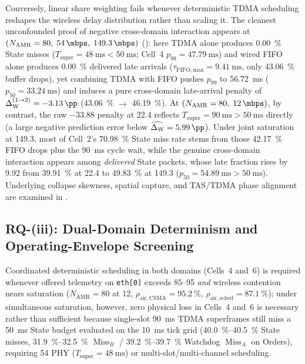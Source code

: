\documentclass[11pt,a4paper]{article}
\newcommand{\Namr}{\ensuremath{N_{\mathrm{AMR}}}}
\newcommand{\Tsuper}{\ensuremath{T_{\mathrm{super}}}}
\newcommand{\MissA}{\ensuremath{\operatorname{Miss}_A}}
\newcommand{\MissB}{\ensuremath{\operatorname{Miss}_B}}
\newcommand{\GainW}{\ensuremath{\Delta_{\mathrm{W}}}}
\newcommand{\GainWpair}{\ensuremath{\Delta_{\mathrm{W}}^{(1\to 2)}}}
\begin{document}
Conversely, linear share weighting fails whenever deterministic TDMA scheduling reshapes the wireless delay distribution rather than scaling it. The cleanest unconfounded proof of negative cross-domain interaction appears at $(\Namr=80,\; \qty{54}{\mbps},\; \qty{149.3}{\mbps})$ (): here TDMA alone produces \qty{0.00}{\percent} State misses ($\Tsuper = \qty{48}{\milli\second} < \qty{50}{\milli\second}$; Cell~4 $p_{99}=\qty{47.79}{\milli\second}$) and wired FIFO alone produces \qty{0.00}{\percent} delivered late arrivals ($\tau_{\mathrm{FIFO,max}} = \qty{9.41}{\milli\second}$, only \qty{43.06}{\percent} buffer drops), yet combining TDMA with FIFO pushes $p_{99}$ to \qty{56.72}{\milli\second} ($p_{50} = \qty{33.24}{\milli\second}$) and induces a pure cross-domain late-arrival penalty of $\GainWpair = \qty{-3.13}{\pp}$ (\qty{43.06}{\percent} $\to$ \qty{46.19}{\percent}). At $(\Namr=80,\; \qty{12}{\mbps})$, by contrast, the raw \qty{-33.88}{\pp} penalty at \qty{22.4}{\mbps} reflects $\Tsuper = \qty{90}{\milli\second} > \qty{50}{\milli\second}$ directly (a large negative prediction error below $\widehat{\GainW} = \qty{+5.99}{\pp}$). Under joint saturation at \qty{149.3}{\mbps}, most of Cell~2's \qty{70.98}{\percent} State miss rate stems from those \qty{42.17}{\percent} FIFO drops plus the \qty{90}{\milli\second} cycle wait, while the genuine cross-domain interaction appears among \emph{delivered} State packets, whose late fraction rises by \qty{+9.92}{\pp} from \qty{39.91}{\percent} at \qty{22.4}{\mbps} to \qty{49.83}{\percent} at \qty{149.3}{\mbps} ($p_{50} = \qty{54.89}{\milli\second} > \qty{50}{\milli\second}$). Underlying collapse skewness, spatial capture, and TAS/TDMA phase alignment are examined in .

\subsection{RQ-(iii): Dual-Domain Determinism and Operating-Envelope Screening}
\label{sec:rq3}

Coordinated deterministic scheduling in both domains (Cells~4 and~6) is required whenever offered telemetry on \texttt{eth[0]} exceeds \qtyrange{85}{95}{\mbps} \emph{and} wireless contention nears saturation ($\Namr=80$ at \qty{12}{\mbps}, $\rho_{\mathrm{air,CSMA}} = \qty{95.2}{\percent}$, $\rho_{\mathrm{air,sched}} = \qty{87.1}{\percent}$); under simultaneous saturation, however, zero physical loss in Cells~4 and~6 is necessary rather than sufficient because single-slot \qty{90}{\milli\second} TDMA superframes still miss a \qty{50}{\milli\second} State budget evaluated on the \qty{10}{\milli\second} tick grid (\qtyrange{40.0}{40.5}{\percent} State misses, \qtyrange{31.9}{32.5}{\percent} $\MissB$ / \qtyrange{39.2}{39.7}{\percent} Watchdog $\MissA$ on Orders), requiring \qty{54}{\mbps} PHY ($\Tsuper = \qty{48}{\milli\second}$) or multi-slot/multi-channel scheduling.
\end{document}
